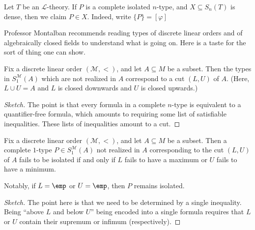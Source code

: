 \documentclass[../notes.tex]{subfiles}
\begin{document}
\begin{remark}
	Let $T$ be an $\mathcal L$-theory. If $P$ is a complete isolated $n$-type, and $X\subseteq S_n(T)$ is dense, then we claim $P\in X$. Indeed, write $\{P\}=[\varphi]$
\end{remark}
Professor Montalban recommends reading types of discrete linear orders and of algebraically closed fields to understand what is going on. Here is a taste for the sort of thing one can show.
\begin{proposition}
	Fix a discrete linear order $(\mathcal M,<)$, and let $A\subseteq M$ be a subset. Then the types in $S_1^{\mathcal M}(A)$ which are not realized in $A$ correspond to a cut $(L,U)$ of $A$. (Here, $L\cup U=A$ and $L$ is closed downwards and $U$ is closed upwards.)
\end{proposition}
\begin{proof}[Sketch]
	The point is that every formula in a complete $n$-type is equivalent to a quantifier-free formula, which amounts to requiring some list of satisfiable inequalities. These lists of inequalities amount to a cut.
\end{proof}
\begin{proposition}
	Fix a discrete linear order $(\mathcal M,<)$, and let $A\subseteq M$ be a subset. Then a complete $1$-type $P\in S_1^{\mathcal M}(A)$ not realized in $A$ corresponding to the cut $(L,U)$ of $A$ fails to be isolated if and only if $L$ fails to have a maximum or $U$ fails to have a minimum.
\end{proposition}
Notably, if $L=\emp$ or $U=\emp$, then $P$ remains isolated.
\begin{proof}[Sketch]
	The point here is that we need to be determined by a single inequality. Being ``above $L$ and below $U$'' being encoded into a single formula requires that $L$ or $U$ contain their supremum or infimum (respectively).
\end{proof}
\end{document}
